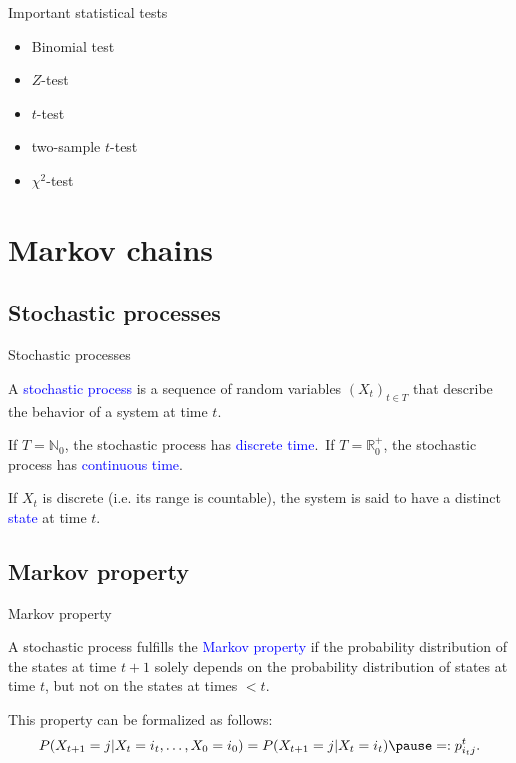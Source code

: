\documentclass{beamer}
\def\spadding{\vspace{0.25cm}}
\def\b{\textcolor{blue}}
\begin{document}
\begin{frame}
    \begin{block}{Important statistical tests}\pause
        \begin{itemize}
            \item Binomial test\pause
            \item $Z$-test\pause
            \item $t$-test\pause
            \item two-sample $t$-test\pause
            \item $\chi^2$-test
        \end{itemize}
    \end{block}
\end{frame}

\section{Markov chains}
\subsection{Stochastic processes}
\begin{frame}{Stochastic processes}
    \begin{definition}
        A \b{stochastic process} is a sequence of random variables $(X_t)_{t \in T}$ that describe the behavior of a system at time $t$.\pause\par\spadding
        If $T = \mathbb{N}_0$, the stochastic process has \b{discrete time}.\pause\ If $T = \mathbb{R}_0^+$, the stochastic process has \b{continuous time}.\par
        If $X_t$ is discrete (i.e. its range is countable), the system is said to have a distinct \b{state} at time $t$.
    \end{definition}
\end{frame}

\subsection{Markov property}
\begin{frame}{Markov property}
    \begin{definition}
        A stochastic process fulfills the \b{Markov property} if the probability distribution of the states at time $t + 1$ solely depends on the probability distribution of states at time $t$, but not on the states at times $< t$.\pause\par\spadding
        This property can be formalized as follows:
        \begin{align*}
            P(X_{t+1} = j | X_t = i_t, \dots, X_0 = i_0) = P(X_{t+1} = j | X_t = i_t)\pause =: p_{i_t j}^t.
        \end{align*}
    \end{definition}
\end{frame}
\end{document}
